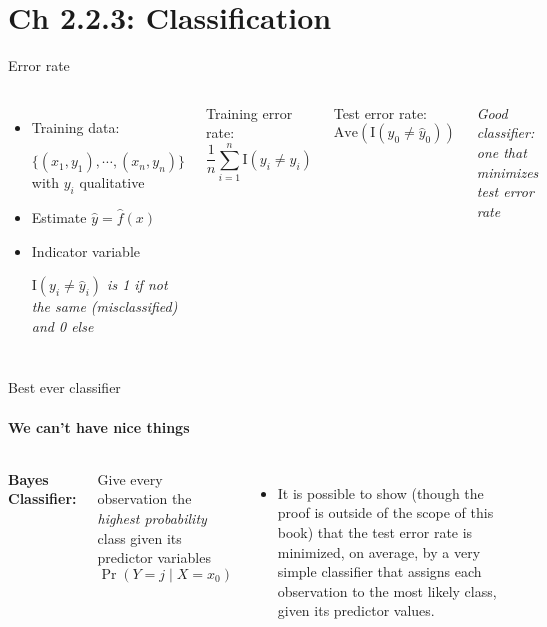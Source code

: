 \documentclass[aspectratio=169,usenames,dvipsnames]{beamer}
\newcommand{\InstructorNotes}[1]{\textit{\color{orange}#1}}
\newcommand{\InstructorList}[1]{
\begin{itemize}
	\color{orange}
	#1
\end{itemize}
}
\begin{document}
\section{Ch 2.2.3: Classification}
\begin{frame}[t]{Error rate}



\begin{columns}
\centering
\begin{itemize}
	\item
Training data:

$\{ (x_1,y_1),\cdots,(x_n,y_n) \}$ with $y_i$ qualitative

\item Estimate $\hat y = \hat f (x)$
\item Indicator variable

\InstructorNotes{$\mathrm{I}(y_i \neq \hat y_i)$ is 1 if not the same (misclassified) and 0 else}
\end{itemize}

Training error rate:
\begin{equation*}
\frac{1}{n} \sum_{i = 1}^n \mathrm{I}(y_i \neq \hat y_i)
\end{equation*}

Test error rate:
\begin{equation*}
	\mathrm{Ave}(\mathrm{I} (y_0 \neq \hat y_0))
\end{equation*}

\InstructorNotes{Good classifier: one that minimizes test error rate}

\end{columns}

\end{frame}


\begin{frame}[c]{Best ever classifier }
	\framesubtitle{We can't have nice things}

\begin{columns}
\textbf{Bayes Classifier:}

Give every observation the \emph{highest probability} class given its predictor variables
\begin{equation*}
	\Pr (Y = j \mid X = x_0)
\end{equation*}
\centering
\InstructorList{
  \item It is possible to show (though the proof is outside of the scope of this
  book) that the test error rate  is minimized, on average, by a
  very simple classifier that assigns each observation to the most likely class,
  given its predictor values.
}

\end{columns}

\end{frame}
\end{document}
